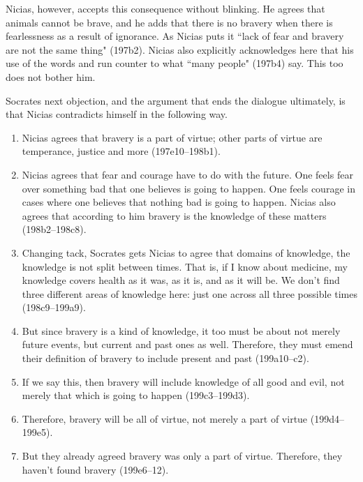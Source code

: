 \documentclass[11pt]{article}
\begin{document}
Nicias, however, accepts this consequence without blinking.  He agrees that
animals cannot be brave, and he adds that there is no bravery when there is
fearlessness as a result of ignorance.  As Nicias puts it ``lack of fear and
bravery are not the same thing" (197b2).  Nicias also explicitly acknowledges
here that his use of the words  and  run counter to
what ``many people" (197b4) say.  This too does not bother him.

Socrates next objection, and the argument that ends the dialogue ultimately, is
that Nicias contradicts himself in the following way.

\begin{enumerate}

    \item Nicias agrees that bravery is a part of virtue; other parts of virtue
        are temperance, justice and more (197e10--198b1).

    \item Nicias agrees that fear and courage have to do with the future.  One
        feels fear over something bad that one believes is going to happen.
        One feels courage in cases where one believes that nothing bad is going
        to happen.  Nicias also agrees that according to him bravery is the
        knowledge of these matters (198b2--198c8).

    \item Changing tack, Socrates gets Nicias to agree that domains of
        knowledge, the knowledge is not split between times.  That is, if
        I know about medicine, my knowledge covers health as it was, as it is,
        and as it will be.  We don't find three different areas of knowledge
        here: just one across all three possible times (198c9--199a9).

    \item But since bravery is a kind of knowledge, it too must be about not
        merely future events, but current and past ones as well. Therefore,
        they must emend their definition of bravery to include present and past
        (199a10--c2).

    \item If we say this, then bravery will include knowledge of all good and
        evil, not merely that which is going to happen (199c3--199d3).

    \item Therefore, bravery will be all of virtue, not merely a part of virtue
        (199d4--199e5).

    \item But they already agreed bravery was only a part of virtue.
        Therefore, they haven't found bravery (199e6--12).

\end{enumerate}
\end{document}

